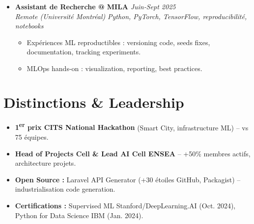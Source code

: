 \documentclass[a4paper,11pt]{article}
\begin{document}
\begin{itemize}[leftmargin=*, label=\tiny$\bullet$, nosep]
    \item \textbf{Assistant de Recherche @ MILA} \hfill \textit{Juin-Sept 2025} \\
    \textit{Remote (Universit\'e Montr\'eal)} \hfill \textit{Python, PyTorch, TensorFlow, reproducibilit\'e, notebooks}
    \vspace{-2pt}
    \begin{itemize}[leftmargin=0.4cm, nosep, label=\tiny$\bullet$]
        \item \small{Exp\'eriences ML reproductibles : versioning code, seeds fixes, documentation, tracking experiments.}
        \item \small{MLOps hands-on : visualization, reporting, best practices.}
    \end{itemize}
\end{itemize}

\section{Distinctions \& Leadership}
\begin{itemize}[leftmargin=*, label=\tiny$\bullet$, nosep]
    \item \small{\textbf{1\textsuperscript{er} prix CITS National Hackathon} (Smart City, infrastructure ML) -- vs 75 \'equipes.}
    \item \small{\textbf{Head of Projects Cell \& Lead AI Cell ENSEA} -- +50\% membres actifs, architecture projets.}
    \item \small{\textbf{Open Source :} Laravel API Generator (+30 \'etoiles GitHub, Packagist) -- industrialisation code generation.}
    \item \small{\textbf{Certifications :} Supervised ML Stanford/DeepLearning.AI (Oct. 2024), Python for Data Science IBM (Jan. 2024).}
\end{itemize}
\end{document}

